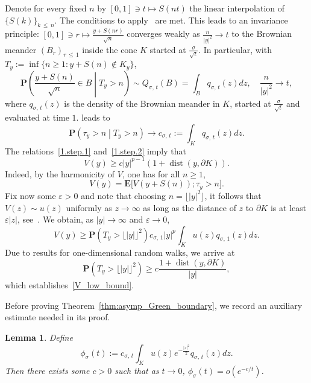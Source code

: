 \documentclass[10pt]{amsart}
\newtheorem{lemm}[theo]{Lemma}\newtheorem{prop}[theo]{Proposition}\newtheorem{coro}[theo]{Corollary}\newtheorem{conj}[theo]{Conjecture}
\theoremstyle{definition}\newtheorem{defi}[theo]{Definition}\newtheorem{rema}[theo]{Remark}\newtheorem{exam}[theo]{Example}\newtheorem{exem}[theo]{Example}\newtheorem{nota}[theo]{Notation}
\DeclareMathOperator{\dist}{dist}
\newcommand{\pr}{\mathbf{P}}
\newcommand{\e}{\mathbf{E}}
\renewcommand{\epsilon}{\varepsilon}
\renewcommand{\le}{\leqslant}
\renewcommand{\ge}{\geqslant}
\begin{document}
Denote for every fixed $n$ by $[0,1]\ni t\mapsto S(nt)$ the linear interpolation of $\{S(k)\}_{k\,\le\,n}$. The conditions to apply~\cite[Theorem~2.3]{Du-78} are met. This leads to an invariance principle: $[0,1]\ni r\mapsto\frac{y+S(nr)}{\sqrt{n}}$ converges weakly as $\frac{n}{|y|^2}\to t$ to the Brownian meander $(B_r)_{r\,\le\,1}$ inside the cone $K$ started at $\frac{\sigma}{\sqrt{t}}$. In particular, with $T_y:=\inf\{n\ge1: y+S(n)\notin K_y\}$,
\begin{equation}\label{1.step.1}
\pr\left(\frac{y+S(n)}{\sqrt{n}}\in B\middle| T_y>n\right)\sim Q_{\sigma,\,t}(B)=\int_B q_{\sigma,\,t}(z)dz,\quad
\frac{n}{|y|^2}\to t,
\end{equation}
where $q_{\sigma,\,t}(z)$ is the density of the Brownian meander in $K$, started at $\frac{\sigma}{\sqrt{t}}$ and evaluated at time $1$. \cite[Theorem~2.3]{Du-78} leads to
\begin{equation}\label{1.step.2}
\pr\left(\tau_y>n\middle| T_y>n\right)\to c_{\sigma,\,t}:=\int_K q_{\sigma,\,t}(z)dz.
\end{equation}
The relations~\eqref{1.step.1} and~\eqref{1.step.2} imply that
\begin{equation}\label{V_low_bound}
V(y)\ge c|y|^{p-1}\left(1+\dist(y,\partial K)\right).
\end{equation}
Indeed, by the harmonicity of $V$, one has for all $n\ge1$,
\[
V(y)=\e\big[V\left(y+S(n)\right);\tau_y>n\big].
\]
Fix now some $\epsilon>0$ and note that choosing $n=\lfloor| y|^2\rfloor$, it follows that $V(z)\sim u(z)$ uniformly as $z\to\infty$ as long as the distance of $z$ to $\partial K$ is at least $\epsilon| z|$, see~\cite[Lemma~13]{DeWa-15}. We obtain, as $| y|\to\infty$ and $\epsilon\rightarrow 0$,
\[
V(y)\ge \pr\left(T_y>\lfloor|y|\rfloor^2\right)c_{\sigma,\,1}| y|^p\int_K u(z)q_{\sigma,\,1}(z)dz.
\]
Due to results for one-dimensional random walks, we arrive at
\[
\pr\left(T_y>\lfloor|y|\rfloor^2\right)\ge c\frac{1+\dist\left(y,\partial K\right)}{|y|},
\]
which establishes~\eqref{V_low_bound}.

Before proving Theorem~\ref{thm:asymp_Green_boundary}, we record an auxiliary estimate needed in its proof.

\begin{lemm}\label{thm:auxmeander}
Define
\[
\phi_\sigma(t):=c_{\sigma,\,t}\int_K u(z)e^{-\frac{| z|^2}{2}}q_{\sigma,\,t}(z)dz.
\]
Then there exists some $c>0$ such that as $t\to 0$, $\phi_\sigma(t)=o(e^{-c/t})$.
\end{lemm}
\end{document}
